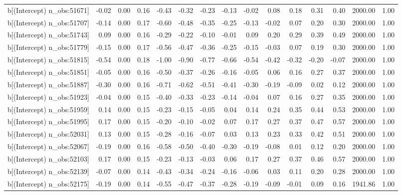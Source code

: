 \begin{table}[ht]
\begin{tabular}{rrrrrrrrrrrrrrr}
  b[(Intercept) n\_obs:51671] & -0.02 & 0.00 & 0.16 & -0.43 & -0.32 & -0.23 & -0.13 & -0.02 & 0.08 & 0.18 & 0.31 & 0.40 & 2000.00 & 1.00 \\ 
  b[(Intercept) n\_obs:51707] & -0.14 & 0.00 & 0.17 & -0.60 & -0.48 & -0.35 & -0.25 & -0.13 & -0.02 & 0.07 & 0.20 & 0.30 & 2000.00 & 1.00 \\ 
  b[(Intercept) n\_obs:51743] & 0.09 & 0.00 & 0.16 & -0.29 & -0.22 & -0.10 & -0.01 & 0.09 & 0.20 & 0.29 & 0.39 & 0.49 & 2000.00 & 1.00 \\ 
  b[(Intercept) n\_obs:51779] & -0.15 & 0.00 & 0.17 & -0.56 & -0.47 & -0.36 & -0.25 & -0.15 & -0.03 & 0.07 & 0.19 & 0.30 & 2000.00 & 1.00 \\ 
  b[(Intercept) n\_obs:51815] & -0.54 & 0.00 & 0.18 & -1.00 & -0.90 & -0.77 & -0.66 & -0.54 & -0.42 & -0.32 & -0.20 & -0.07 & 2000.00 & 1.00 \\ 
  b[(Intercept) n\_obs:51851] & -0.05 & 0.00 & 0.16 & -0.50 & -0.37 & -0.26 & -0.16 & -0.05 & 0.06 & 0.16 & 0.27 & 0.37 & 2000.00 & 1.00 \\ 
  b[(Intercept) n\_obs:51887] & -0.30 & 0.00 & 0.16 & -0.71 & -0.62 & -0.51 & -0.41 & -0.30 & -0.19 & -0.09 & 0.02 & 0.12 & 2000.00 & 1.00 \\ 
  b[(Intercept) n\_obs:51923] & -0.04 & 0.00 & 0.15 & -0.40 & -0.33 & -0.23 & -0.14 & -0.04 & 0.07 & 0.16 & 0.27 & 0.35 & 2000.00 & 1.00 \\ 
  b[(Intercept) n\_obs:51959] & 0.14 & 0.00 & 0.15 & -0.23 & -0.15 & -0.05 & 0.04 & 0.14 & 0.24 & 0.35 & 0.44 & 0.53 & 2000.00 & 1.00 \\ 
  b[(Intercept) n\_obs:51995] & 0.17 & 0.00 & 0.15 & -0.20 & -0.10 & -0.02 & 0.07 & 0.17 & 0.27 & 0.37 & 0.47 & 0.57 & 2000.00 & 1.00 \\ 
  b[(Intercept) n\_obs:52031] & 0.13 & 0.00 & 0.15 & -0.28 & -0.16 & -0.07 & 0.03 & 0.13 & 0.23 & 0.33 & 0.42 & 0.51 & 2000.00 & 1.00 \\ 
  b[(Intercept) n\_obs:52067] & -0.19 & 0.00 & 0.16 & -0.58 & -0.50 & -0.40 & -0.30 & -0.19 & -0.08 & 0.01 & 0.12 & 0.20 & 2000.00 & 1.00 \\ 
  b[(Intercept) n\_obs:52103] & 0.17 & 0.00 & 0.15 & -0.23 & -0.13 & -0.03 & 0.06 & 0.17 & 0.27 & 0.37 & 0.46 & 0.57 & 2000.00 & 1.00 \\ 
  b[(Intercept) n\_obs:52139] & -0.07 & 0.00 & 0.14 & -0.43 & -0.34 & -0.24 & -0.16 & -0.06 & 0.03 & 0.11 & 0.20 & 0.28 & 2000.00 & 1.00 \\ 
  b[(Intercept) n\_obs:52175] & -0.19 & 0.00 & 0.14 & -0.55 & -0.47 & -0.37 & -0.28 & -0.19 & -0.09 & -0.01 & 0.09 & 0.16 & 1941.86 & 1.00 \\ 

\end{tabular}
\end{table}
